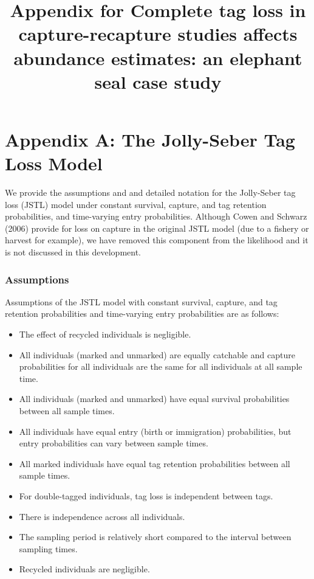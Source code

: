 \documentclass[]{article}
\title{Appendix for Complete tag loss in capture-recapture studies affects abundance estimates: an elephant seal case study}
\author{}
\date{}
\providecommand{\tightlist}{%
  \setlength{\itemsep}{0pt}\setlength{\parskip}{0pt}}
\begin{document}
\maketitle

\section{Appendix A: The Jolly-Seber Tag Loss
Model}\label{web-appendix-a-the-jolly-seber-tag-loss-model}

We provide the assumptions and and detailed notation for the Jolly-Seber tag loss (JSTL) model under constant survival, capture, and tag retention probabilities, and time-varying entry probabilities.  Although Cowen and Schwarz (2006) provide for loss on capture in the original JSTL model (due to a fishery or harvest for example), we have removed this component from the likelihood and it is not discussed in this development.

\subsubsection{Assumptions}\label{assumptions}

Assumptions of the JSTL model with constant survival, capture, and tag
retention probabilities and time-varying entry probabilities are as
follows:

\begin{itemize}
\tightlist
\item
  The effect of recycled individuals is negligible.
\item
  All individuals (marked and unmarked) are equally catchable and 
  capture probabilities for all individuals are the same for all
  individuals at all sample time.
\item
  All individuals (marked and unmarked) have equal survival
  probabilities between all sample times.
\item
  All individuals have equal entry (birth or immigration) probabilities,
  but entry probabilities can vary between sample times.
\item
  All marked individuals have equal tag retention probabilities between
  all sample times.
\item
  For double-tagged individuals, tag loss is independent between tags.
\item
  There is independence across all individuals.
\item
  The sampling period is relatively short compared to the interval
  between sampling times.
\item
Recycled individuals are negligible.  
\end{itemize}
\end{document}
